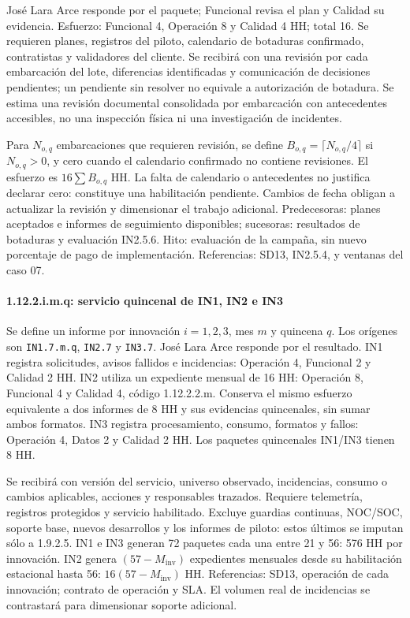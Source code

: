 José Lara Arce responde por el paquete; Funcional revisa el plan y Calidad su evidencia. Esfuerzo: Funcional 4, Operación 8 y Calidad 4 HH; total 16. Se requieren planes, registros del piloto, calendario de botaduras confirmado, contratistas y validadores del cliente. Se recibirá con una revisión por cada embarcación del lote, diferencias identificadas y comunicación de decisiones pendientes; un pendiente sin resolver no equivale a autorización de botadura. Se estima una revisión documental consolidada por embarcación con antecedentes accesibles, no una inspección física ni una investigación de incidentes.

Para $N_{o,q}$ embarcaciones que requieren revisión, se define $B_{o,q}=\lceil N_{o,q}/4\rceil$ si $N_{o,q}>0$, y cero cuando el calendario confirmado no contiene revisiones. El esfuerzo es $16\sum B_{o,q}$ HH. La falta de calendario o antecedentes no justifica declarar cero: constituye una habilitación pendiente. Cambios de fecha obligan a actualizar la revisión y dimensionar el trabajo adicional. Predecesoras: planes aceptados e informes de seguimiento disponibles; sucesoras: resultados de botaduras y evaluación IN2.5.6. Hito: evaluación de la campaña, sin nuevo porcentaje de pago de implementación. Referencias: SD13, IN2.5.4, y ventanas del caso 07.

\paragraph{1.12.2.i.m.q: servicio quincenal de IN1, IN2 e IN3}
Se define un informe por innovación $i=1,2,3$, mes $m$ y quincena $q$. Los orígenes son \texttt{IN1.7.m.q}, \texttt{IN2.7} y \texttt{IN3.7}. José Lara Arce responde por el resultado. IN1 registra solicitudes, avisos fallidos e incidencias: Operación 4, Funcional 2 y Calidad 2 HH. IN2 utiliza un expediente mensual de 16 HH: Operación 8, Funcional 4 y Calidad 4, código 1.12.2.2.m. Conserva el mismo esfuerzo equivalente a dos informes de 8 HH y sus evidencias quincenales, sin sumar ambos formatos. IN3 registra procesamiento, consumo, formatos y fallos: Operación 4, Datos 2 y Calidad 2 HH. Los paquetes quincenales IN1/IN3 tienen 8 HH.

Se recibirá con versión del servicio, universo observado, incidencias, consumo o cambios aplicables, acciones y responsables trazados. Requiere telemetría, registros protegidos y servicio habilitado. Excluye guardias continuas, NOC/SOC, soporte base, nuevos desarrollos y los informes de piloto: estos últimos se imputan sólo a 1.9.2.5. IN1 e IN3 generan 72 paquetes cada una entre 21 y 56: 576 HH por innovación. IN2 genera $(57-M_{\mathrm{inv}})$ expedientes mensuales desde su habilitación estacional hasta 56: $16(57-M_{\mathrm{inv}})$ HH. Referencias: SD13, operación de cada innovación; contrato de operación y SLA. El volumen real de incidencias se contrastará para dimensionar soporte adicional.

